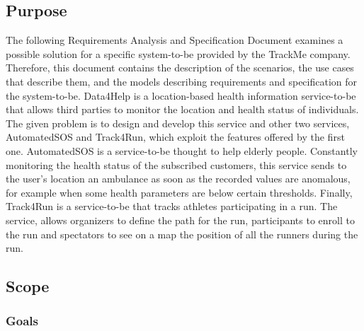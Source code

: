 \subsection{Purpose} 
The following Requirements Analysis and Specification Document examines a possible solution for a specific system-to-be provided by the TrackMe company. Therefore, this document contains the description of the scenarios, the use cases that describe them, and the models describing requirements and specification for the system-to-be.
\bigbreak
\noindent
Data4Help is a location-based health information service-to-be that allows third parties to monitor the location and health status of individuals. The given problem is to design and develop this service and other two services, AutomatedSOS and Track4Run, which exploit the features offered by the first one.
\bigbreak
\noindent
AutomatedSOS is a service-to-be thought to help elderly people. Constantly monitoring the health status of the subscribed customers, this service sends to the user's location an ambulance as soon as the recorded values are anomalous, for example when some health parameters are below certain thresholds.
\bigbreak
\noindent
Finally, Track4Run is a service-to-be that tracks athletes participating in a run. The service, allows organizers to define the path for the run, participants to enroll to the run and spectators to see on a map the position of all the runners during the run.
\subsection{Scope}
\subsubsection{Goals}


